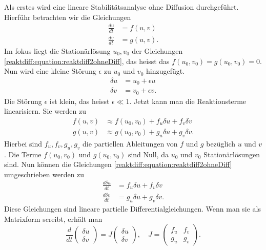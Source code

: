 Als erstes wird eine lineare Stabilitätsanalyse ohne Diffusion durchgeführt.
Hierführ betrachten wir die Gleichungen
\begin{align}
    \label{reaktdiff:equation:reaktdiff2ohneDiff}
    \frac{du}{dt} &= f(u,v)\\
    \frac{dv}{dt} &= g(u,v).
\end{align}
Im fokus liegt die Stationärlösung \(u_0, v_0\) der Gleichungen \ref{reaktdiff:equation:reaktdiff2ohneDiff}, das heisst das \(f(u_0,v_0) = g(u_0,v_0) = 0\).
Nun wird eine kleine Störung \(\epsilon\) zu \(u_0\) und \(v_0\) hinzugefügt.
\begin{align}
    \delta u &= u_0 + \epsilon u\\
    \delta v &= v_0 + \epsilon v.
\end{align}
Die Störung \(\epsilon\) ist klein, das heisst \(\epsilon \ll 1\).
Jetzt kann man die Reaktionsterme linearisiern.
Sie werden zu
\begin{align}
    f(u,v) &\approx f(u_0,v_0) + f_u \delta u + f_v\delta v\\
    g(u,v) &\approx g(u_0,v_0) + g_u \delta u + g_v\delta v.
\end{align}
Hierbei sind \(f_u, f_v, g_u, g_v\) die partiellen Ableitungen von \(f\) und \(g\) bezüglich \(u\) und \(v\).
Die Terme \(f(u_0,v_0)\) und \(g(u_0,v_0)\) sind Null, da \(u_0\) und \(v_0\) Stationärlösungen sind.
Nun können die Gleichungen \ref{reaktdiff:equation:reaktdiff2ohneDiff} umgeschrieben werden zu
\begin{align}
    \label{reaktdiff:equation:reaktdiff2ohneDifflinearisiert1}
    \frac{d \delta u}{dt} &= f_u \delta u + f_v \delta v\\
    \label{reaktdiff:equation:reaktdiff2ohneDifflinearisiert2}
    \frac{d \delta v}{dt} &= g_u \delta u + g_v \delta v.
\end{align}
Diese Gleichungen sind lineare partielle Differentialgleichungen.
Wenn man sie als Matrixform screibt, erhält man
\begin{equation}
    \label{reaktdiff:equation:reaktdiff2ohneDiffmatrix}
    \frac{d}{dt} \begin{pmatrix}
        \delta u\\
        \delta v
    \end{pmatrix} = 
    J 
    \begin{pmatrix}
        \delta u\\
        \delta v
    \end{pmatrix}
    , \quad
    J =
    \begin{pmatrix}
        f_u & f_v\\
        g_u & g_v
    \end{pmatrix}.
\end{equation}

